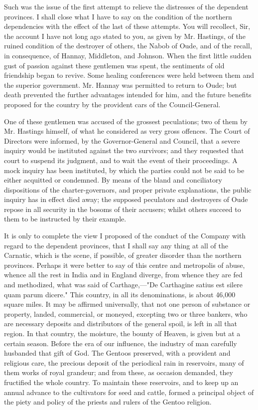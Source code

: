 Such was the issue of the first attempt to relieve the distresses of the dependent provinces. I shall close what I have to say on the condition of the northern dependencies with the effect of the last of these attempts. You will recollect, Sir, the account I have not long ago stated to you, as given by Mr. Hastings, of the ruined condition of the destroyer of others, the Nabob of Oude, and of the recall, in consequence, of Hannay, Middleton, and Johnson. When the first little sudden gust of passion against these gentlemen was spent, the sentiments of old friendship began to revive. Some healing conferences were held between them and the superior government. Mr. Hannay was permitted to return to Oude; but death prevented the further advantages intended for him, and the future benefits proposed for the country by the provident cars of the Council-General.

One of these gentlemen was accused of the grossest peculations; two of them by Mr. Hastings himself, of what he considered as very gross offences. The Court of Directors were informed, by the Governor-General and Council, that a severe inquiry would be instituted against the two survivors; and they requested that court to suspend its judgment, and to wait the event of their proceedings. A mock inquiry has been instituted, by which the parties could not be said to be either acquitted or condemned. By means of the bland and conciliatory dispositions of the charter-governors, and proper private explanations, the public inquiry has in effect died away; the supposed peculators and destroyers of Oude repose in all security in the bosoms of their accusers; whilst others succeed to them to be instructed by their example.

It is only to complete the view I proposed of the conduct of the Company with regard to the dependent provinces, that I shall say any thing at all of the Carnatic, which is the scene, if possible, of greater disorder than the northern provinces. Perhaps it were better to say of this centre and metropolis of abuse, whence all the rest in India and in England diverge, from whence they are fed and methodized, what was said of Carthage,—"De Carthagine satius est silere quam parum dicere." This country, in all its denominations, is about 46,000 square miles. It may be affirmed universally, that not one person of substance or property, landed, commercial, or moneyed, excepting two or three bankers, who are necessary deposits and distributors of the general spoil, is left in all that region. In that country, the moisture, the bounty of Heaven, is given but at a certain season. Before the era of our influence, the industry of man carefully husbanded that gift of God. The Gentoos preserved, with a provident and religious care, the precious deposit of the periodical rain in reservoirs, many of them works of royal grandeur; and from these, as occasion demanded, they fructified the whole country. To maintain these reservoirs, and to keep up an annual advance to the cultivators for seed and cattle, formed a principal object of the piety and policy of the priests and rulers of the Gentoo religion.

